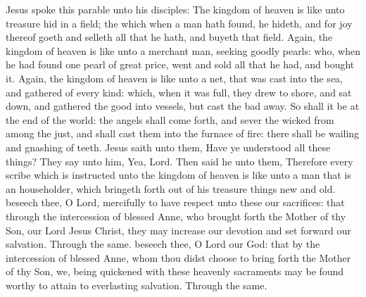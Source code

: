  Jesus spoke this parable unto his disciples: The kingdom of heaven is like unto treasure hid in a field; the which when a man hath found, he hideth, and for joy thereof goeth and selleth all that he hath, and buyeth that field. Again, the kingdom of heaven is like unto a merchant man, seeking goodly pearls: who, when he had found one pearl of great price, went and sold all that he had, and bought it. Again, the kingdom of heaven is like unto a net, that was cast into the sea, and gathered of every kind: which, when it was full, they drew to shore, and sat down, and gathered the good into vessels, but cast the bad away. So shall it be at the end of the world: the angels shall come forth, and sever the wicked from among the just, and shall cast them into the furnace of fire: there shall be wailing and gnashing of teeth. Jesus saith unto them, Have ye understood all these things? They say unto him, Yea, Lord. Then said he unto them, Therefore every scribe which is instructed unto the kingdom of heaven is like unto a man that is an householder, which bringeth forth out of his treasure things new and old.
\secret
{} beseech thee, O Lord, mercifully to have respect unto these our sacrifices: that through the intercession of blessed Anne, who brought forth the Mother of thy Son, our Lord Jesus Christ, they may increase our devotion and set forward our salvation. Through the same.
\postcommunion
{} beseech thee, O Lord our God: that by the intercession of blessed Anne, whom thou didst choose to bring forth the Mother of thy Son, we, being quickened with these heavenly sacraments may be found worthy to attain to everlasting salvation. Through the same.

